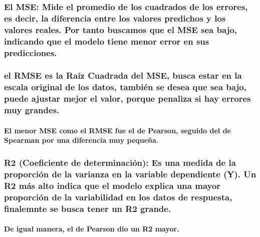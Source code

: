 \documentclass[11pt]{article}
\begin{document}
\subsubsection{El MSE: Mide el promedio de los cuadrados de los errores,
es decir, la diferencia entre los valores predichos y los valores
reales. Por tanto buscamos que el MSE sea bajo, indicando que el modelo
tiene menor error en sus
predicciones.}\label{el-mse-mide-el-promedio-de-los-cuadrados-de-los-errores-es-decir-la-diferencia-entre-los-valores-predichos-y-los-valores-reales.-por-tanto-buscamos-que-el-mse-sea-bajo-indicando-que-el-modelo-tiene-menor-error-en-sus-predicciones.}

\subsubsection{el RMSE es la Raíz Cuadrada del MSE, busca estar en la
escala original de los datos, también se desea que sea bajo, puede
ajustar mejor el valor, porque penaliza si hay errores muy
grandes.}\label{el-rmse-es-la-rauxedz-cuadrada-del-mse-busca-estar-en-la-escala-original-de-los-datos-tambiuxe9n-se-desea-que-sea-bajo-puede-ajustar-mejor-el-valor-porque-penaliza-si-hay-errores-muy-grandes.}

\paragraph{El menor MSE como el RMSE fue el de Pearson, seguido del de
Spearman por una diferencia muy
pequeña.}\label{el-menor-mse-como-el-rmse-fue-el-de-pearson-seguido-del-de-spearman-por-una-diferencia-muy-pequeuxf1a.}

\subsubsection{R2 (Coeficiente de determinación): Es una medida de la
proporción de la varianza en la variable dependiente (Y). Un R2 más alto
indica que el modelo explica una mayor proporción de la variabilidad en
los datos de respuesta, finalemnte se busca tener un R2
grande.}\label{r2-coeficiente-de-determinaciuxf3n-es-una-medida-de-la-proporciuxf3n-de-la-varianza-en-la-variable-dependiente-y.-un-r2-muxe1s-alto-indica-que-el-modelo-explica-una-mayor-proporciuxf3n-de-la-variabilidad-en-los-datos-de-respuesta-finalemnte-se-busca-tener-un-r2-grande.}

\paragraph{De igual manera, el de Pearson dio un R2
mayor.}\label{de-igual-manera-el-de-pearson-dio-un-r2-mayor.}
\end{document}

